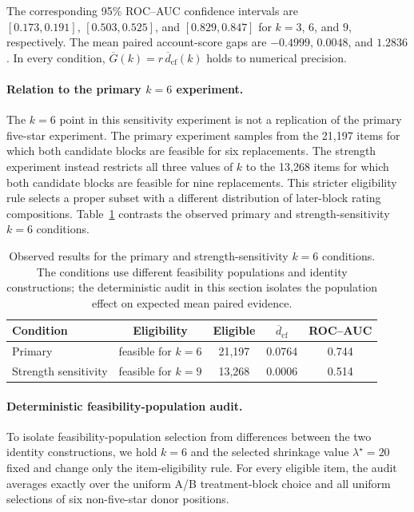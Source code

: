 The corresponding 95\% ROC--AUC confidence intervals are\\
$[0.173,0.191]$, $[0.503,0.525]$, and $[0.829,0.847]$ for
$k=3$, $6$, and $9$, respectively. The mean paired account-score gaps
are $-0.4999$, $0.0048$, and $1.2836$. In every condition,
$\overline G(k)=r\,\overline d_{\mathrm{cf}}(k)$ holds to numerical
precision.

\paragraph{Relation to the primary $k=6$ experiment.}
The $k=6$ point in this sensitivity experiment is not a replication of the
primary five-star experiment. The primary experiment samples from the
21,197 items for which both candidate blocks are feasible for six
replacements. The strength experiment instead restricts all three values of
$k$ to the 13,268 items for which both candidate blocks are feasible for
nine replacements. This stricter eligibility rule selects a proper subset
with a different distribution of later-block rating compositions. Table~\ref{tab:supp-k6-population} contrasts the observed primary and
strength-sensitivity $k=6$ conditions.

\begin{table}[t]
\caption{Observed results for the primary and strength-sensitivity $k=6$
conditions. The conditions use different feasibility populations and
identity constructions; the deterministic audit in this section isolates
the population effect on expected mean paired evidence.}
\label{tab:supp-k6-population}
\centering
\small
\setlength{\tabcolsep}{4pt}
\begin{tabular}{@{}lcccc@{}}
\toprule
\textbf{Condition}
& \textbf{Eligibility}
& \textbf{Eligible}
& $\overline d_{\mathrm{cf}}$
& ROC--AUC \\
\midrule
Primary
& feasible for $k=6$
& 21,197
& 0.0764
& 0.744 \\
Strength sensitivity
& feasible for $k=9$
& 13,268
& 0.0006
& 0.514 \\
\bottomrule
\end{tabular}
\end{table}

\paragraph{Deterministic feasibility-population audit.}
To isolate feasibility-population selection from differences between the
two identity constructions, we hold $k=6$ and the selected shrinkage value
$\lambda^\star=20$ fixed and change only the item-eligibility rule. For
every eligible item, the audit averages exactly over the uniform A/B
treatment-block choice and all uniform selections of six non-five-star
donor positions.

